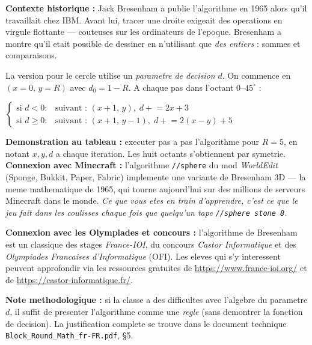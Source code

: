 \documentclass[12pt,a4paper]{scrartcl}
\newcommand{\cmd}[1]{\textcolor{earth}{\texttt{\small #1}}}
\newcommand{\tempo}[1]{\textnormal{\footnotesize\color{bg!90!white}\textsf{#1}}}
\begin{document}
\begin{activite}[2.3 --- Algorithme de Bresenham \quad\tempo{15 min}]\label{at:23}
\textbf{Contexte historique :} Jack Bresenham a publie l'algorithme en 1965 alors qu'il travaillait chez IBM. Avant lui, tracer une droite exigeait des operations en virgule flottante --- couteuses sur les ordinateurs de l'epoque. Bresenham a montre qu'il etait possible de dessiner en n'utilisant que \emph{des entiers} : sommes et comparaisons.

La version pour le cercle utilise un \emph{parametre de decision} $d$. On commence en $(x{=}0,\, y{=}R)$ avec $d_0 = 1 - R$. A chaque pas dans l'octant $0$--$45^\circ$ :

\begin{formule}
\centering
$\begin{cases}
\text{si } d < 0 : & \text{suivant : } (x{+}1,\, y),\; d \mathrel{+}= 2x+3 \\
\text{si } d \geq 0 : & \text{suivant : } (x{+}1,\, y{-}1),\; d \mathrel{+}= 2(x-y)+5
\end{cases}$
\end{formule}

\textbf{Demonstration au tableau :} executer pas a pas l'algorithme pour $R = 5$, en notant $x, y, d$ a chaque iteration. Les huit octants s'obtiennent par symetrie. \\

\textbf{Connexion avec Minecraft :} l'algorithme \cmd{//sphere} du mod \emph{WorldEdit} (Sponge, Bukkit, Paper, Fabric) implemente une variante de Bresenham 3D --- la meme mathematique de 1965, qui tourne aujourd'hui sur des millions de serveurs Minecraft dans le monde. \emph{Ce que vous etes en train d'apprendre, c'est ce que le jeu fait dans les coulisses chaque fois que quelqu'un tape \texttt{//sphere stone 8}.}

\textbf{Connexion avec les Olympiades et concours :} l'algorithme de Bresenham est un classique des stages \emph{France-IOI}, du concours \emph{Castor Informatique} et des \emph{Olympiades Francaises d'Informatique} (OFI). Les eleves qui s'y interessent peuvent approfondir via les ressources gratuites de \url{https://www.france-ioi.org/} et de \url{https://castor-informatique.fr/}.

\textbf{Note methodologique :} si la classe a des difficultes avec l'algebre du parametre $d$, il suffit de presenter l'algorithme comme une \emph{regle} (sans demontrer la fonction de decision). La justification complete se trouve dans le document technique \texttt{Block\_Round\_Math\_fr-FR.pdf}, §5.
\end{activite}
\end{document}
